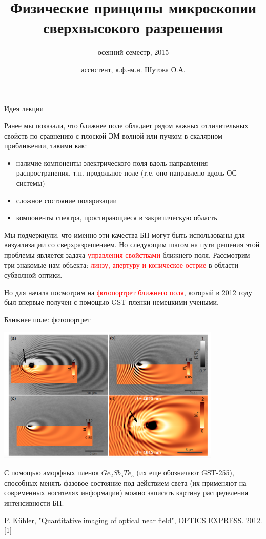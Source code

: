 \documentclass[9pt, compress, xcolor=table]{beamer}
\title{Физические принципы микроскопии сверхвысокого разрешения}
\subtitle{осенний семестр, 2015}
\author{ассистент, к.ф.-м.н. Шутова О.А.}
\institute{МГУ им. М.В. Ломоносова, физический факультет}
\begin{document}
\maketitle


\begin{frame}{Идея лекции}

Ранее мы показали, что ближнее поле обладает рядом важных отличительных свойств по сравнению с плоской ЭМ волной или пучком в скалярном  приближении, такими как:
\begin{itemize}
\item наличие компоненты электрического поля вдоль направления распространения, т.н. продольное поле (т.е. оно направлено вдоль ОС системы)
\item сложное состояние поляризации
\item компоненты спектра, простирающиеся в закритическую область
\end{itemize}

Мы подчеркнули, что именно эти качества БП могут быть использованы для визуализации со сверхразрешением. Но следующим шагом на пути решения этой проблемы является задача \textcolor{red}{управления свойствами} ближнего поля. Рассмотрим три знакомые нам объекта: \textcolor{red}{линзу, апертуру и коническое острие} в области субволной оптики.

Но для начала посмотрим на \textcolor{red}{фотопортрет ближнего поля}, который в 2012 году был впервые получен с помощью GST-пленки немецкими учеными.

\end{frame}

\begin{frame}{Ближнее поле: фотопортрет}

\begin{center}
\includegraphics[width=0.8\textwidth]{near-field2}
\end{center}

С помощью аморфных пленок $Ge_2 Sb_5 Te_5$ (их еще обозначают GST-255), способных менять фазовое состояние под действием света (их применяют на современных носителях информации) можно записать картину распределения интенсивности БП.

\scriptsize{P. K\"uhler, "Quantitative imaging of optical near field", OPTICS EXPRESS. 2012. [1]}
\end{frame}
\end{document}
